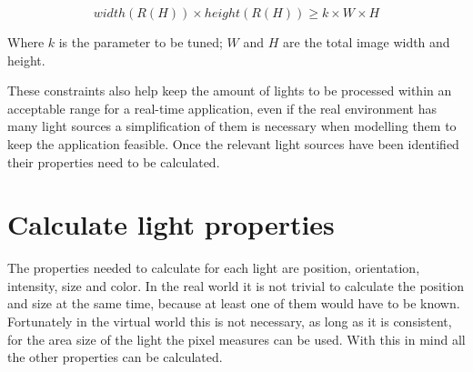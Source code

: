 \begin{equation}
    width(R(H)) \times height(R(H)) \geq k \times W \times H
\end{equation}

Where $k$ is the parameter to be tuned; $W$ and $H$ are the total image width and height.\newline

These constraints also help keep the amount of lights to be processed within an acceptable range for a real-time application, even if the real environment has many light sources a simplification of them is necessary when modelling them to keep the application feasible. Once the relevant light sources have been identified their properties need to be calculated.

\section{Calculate light properties}
The properties needed to calculate for each light are position, orientation, intensity, size and color. In the real world it is not trivial to calculate the position and size at the same time, because at least one of them would have to be known. Fortunately in the virtual world this is not necessary, as long as it is consistent, for the area size of the light the pixel measures can be used. With this in mind all the other properties can be calculated.

